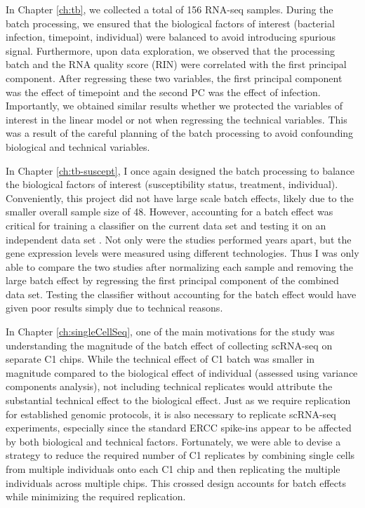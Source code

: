 In Chapter \ref{ch:tb}, we collected a total of 156 RNA-seq
samples. During the batch processing, we ensured that the biological
factors of interest (bacterial infection, timepoint, individual) were
balanced to avoid introducing spurious signal. Furthermore, upon data
exploration, we observed that the processing batch and the RNA quality
score (RIN) were correlated with the first principal component. After
regressing these two variables, the first principal component was the
effect of timepoint and the second PC was the effect of
infection. Importantly, we obtained similar results whether we
protected the variables of interest in the linear model or not when
regressing the technical variables. This was a result of the careful
planning of the batch processing to avoid confounding biological and
technical variables.

In Chapter \ref{ch:tb-suscept}, I once again designed the batch
processing to balance the biological factors of interest
(susceptibility status, treatment, individual). Conveniently, this
project did not have large scale batch effects, likely due to the
smaller overall sample size of 48. However, accounting for a batch
effect was critical for training a classifier on the current data set
and testing it on an independent data set \citep{Barreiro2012}.
Not only were the studies
performed years apart, but the gene expression levels were measured
using different technologies. Thus I was only able to compare the two
studies after normalizing each sample and removing the large batch
effect by regressing the first principal component of the combined
data set. Testing the classifier without accounting for the batch
effect would have given poor results simply due to technical reasons.

In Chapter \ref{ch:singleCellSeq}, one of the main motivations for the
study was understanding the magnitude of the batch effect of
collecting scRNA-seq on separate C1 chips. While the technical effect
of C1 batch was smaller in magnitude compared to the biological effect
of individual (assessed using variance components analysis), not
including technical replicates would attribute the substantial
technical effect to the biological effect. Just as we require
replication for established genomic protocols, it is also necessary to
replicate scRNA-seq experiments, especially since the standard ERCC
spike-ins appear to be affected by both biological and technical
factors. Fortunately, we were able to devise a strategy to reduce the
required number of C1 replicates by combining single cells from
multiple individuals onto each C1 chip and then replicating the
multiple individuals across multiple chips. This crossed design
accounts for batch effects while minimizing the required replication.


